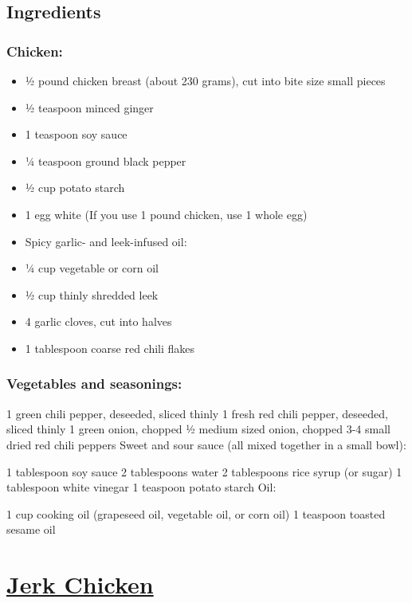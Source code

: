 \documentclass[]{article}
\begin{document}
\hypertarget{ingredients-1}{%
\subsection{Ingredients}\label{ingredients-1}}

\hypertarget{chicken}{%
\subsubsection{Chicken:}\label{chicken}}

\begin{itemize}
\item
  ½ pound chicken breast (about 230 grams), cut into bite size small pieces
\item
  ½ teaspoon minced ginger
\item
  1 teaspoon soy sauce
\item
  ¼ teaspoon ground black pepper
\item
  ½ cup potato starch
\item
  1 egg white (If you use 1 pound chicken, use 1 whole egg)
\item
  Spicy garlic- and leek-infused oil:
\item
  ¼ cup vegetable or corn oil
\item
  ½ cup thinly shredded leek
\item
  4 garlic cloves, cut into halves
\item
  1 tablespoon coarse red chili flakes
\end{itemize}

\hypertarget{vegetables-and-seasonings}{%
\subsubsection{Vegetables and seasonings:}\label{vegetables-and-seasonings}}

1 green chili pepper, deseeded, sliced thinly
1 fresh red chili pepper, deseeded, sliced thinly
1 green onion, chopped
½ medium sized onion, chopped
3-4 small dried red chili peppers
Sweet and sour sauce (all mixed together in a small bowl):

1 tablespoon soy sauce
2 tablespoons water
2 tablespoons rice syrup (or sugar)
1 tablespoon white vinegar
1 teaspoon potato starch
Oil:

1 cup cooking oil (grapeseed oil, vegetable oil, or corn oil)
1 teaspoon toasted sesame oil

\hypertarget{jerk-chicken}{%
\section{\texorpdfstring{\href{https://www.seriouseats.com/recipes/2013/08/jerk-chicken.html}{Jerk Chicken}}{Jerk Chicken}}\label{jerk-chicken}}
\end{document}
